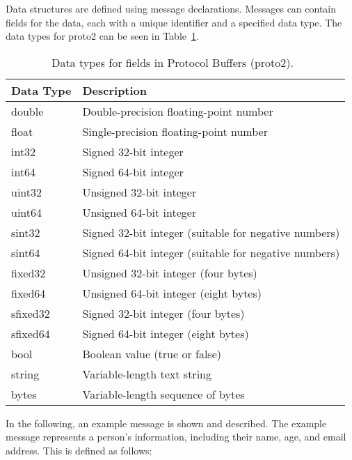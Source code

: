 \documentclass[../MasterThesis.tex]{subfiles}
\begin{document}
\begin{description}[font=\normalfont\color{RedViolet!80!black}, style=nextline]
	

\item[Messages and Fields] 

Data structures are defined using message declarations. Messages can contain fields for the data, each with a unique identifier and a specified data type. The data types for proto2 can be seen in Table~\ref{table:proto2_data_types}.~\cite{proto2_doc}


\begin{table}[H]
	\centering

	\begin{tabular}{ll}
		\toprule
		\textbf{Data Type} & \textbf{Description} \\
		\midrule
		double & Double-precision floating-point number \\
		float & Single-precision floating-point number \\
		int32 & Signed 32-bit integer \\
		int64 & Signed 64-bit integer \\
		uint32 & Unsigned 32-bit integer \\
		uint64 & Unsigned 64-bit integer \\
		sint32 & Signed 32-bit integer (suitable for negative numbers) \\
		sint64 & Signed 64-bit integer (suitable for negative numbers) \\
		fixed32 & Unsigned 32-bit integer (four bytes) \\
		fixed64 & Unsigned 64-bit integer (eight bytes) \\
		sfixed32 & Signed 32-bit integer (four bytes) \\
		sfixed64 & Signed 64-bit integer (eight bytes) \\
		bool & Boolean value (true or false) \\
		string & Variable-length text string  \\
		bytes & Variable-length sequence of bytes \\
		\bottomrule
	\end{tabular}
	\caption{Data types for fields in Protocol Buffers (proto2).~\cite{proto2_doc}}
	\label{table:proto2_data_types}
\end{table}

In the following, an example message is shown and described.
The example message represents a person's information, including their name, age, and email address. This is defined as follows:


\end{description}
\end{document}
